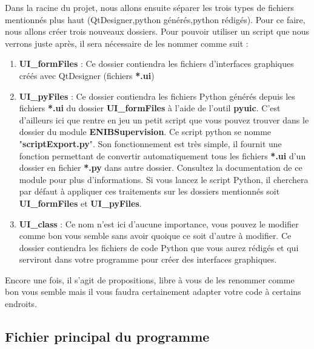 \documentclass[12pt]{report}    %
\newcommand{\bold}[1]{{\bfseries #1}}
\begin{document}
Dans la racine du projet, nous allons ensuite séparer les trois types de fichiers mentionnés plus haut (QtDesigner,python générés,python rédigés). Pour ce faire, nous allons créer  trois nouveaux dossiers. Pour pouvoir utiliser un script que nous verrons juste après, il sera nécessaire de les nommer comme suit :
\begin{enumerate}

\item \textbf{UI\_formFiles} : Ce dossier contiendra les fichiers d'interfaces graphiques créés avec QtDesigner (fichiers \textbf{*.ui})\newline

\item \textbf{UI\_pyFiles} : Ce dossier contiendra les fichiers Python générés depuis les fichiers \textbf{*.ui} du dossier \textbf{UI\_formFiles} à l'aide de l'outil \textbf{pyuic}.\newline
C'est d'ailleurs ici que rentre en jeu un petit script que vous pouvez trouver dans le dossier du module \bold{ENIBSupervision}. Ce script python se nomme "\textbf{scriptExport.py}". Son fonctionnement est très simple, il fournit une fonction permettant de convertir automatiquement tous les fichiers \textbf{*.ui} d'un dossier en fichier \textbf{*.py} dans autre dossier. Consultez la documentation de ce module pour plus d'informations.\newline
Si vous lancez le script Python, il cherchera par défaut à appliquer ces traitements sur les dossiers mentionnés soit \textbf{UI\_formFiles} et \textbf{UI\_pyFiles}.

\item \bold{UI\_class} : Ce nom n'est ici d'aucune importance, vous pouvez le modifier comme bon vous semble sans avoir quoique ce soit d'autre à modifier.\newline
Ce dossier contiendra les fichiers de code Python que vous aurez rédigés et qui serviront dans votre programme pour créer des interfaces graphiques.

\end{enumerate}

Encore une fois, il s'agit de propositions, libre à vous de les renommer comme bon vous semble mais il vous faudra certainement adapter votre code à certains endroits.

\subsection{Fichier principal du programme}
\end{document}
